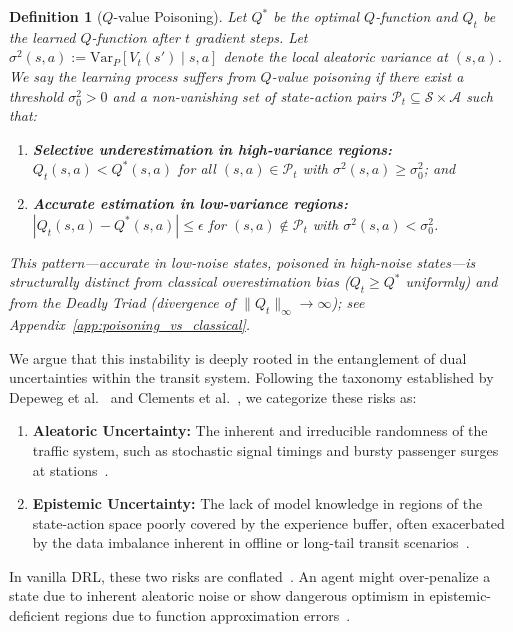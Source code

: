 \documentclass[10pt]{article}
\newtheorem{definition}[theorem]{Definition}
\begin{document}
\begin{definition}[$Q$-value Poisoning]
    \label{def:poisoning}
    Let $Q^*$ be the optimal $Q$-function and $Q_t$ be the learned $Q$-function after $t$ gradient steps.
    Let $\sigma^2(s,a) := \mathrm{Var}_{P}[V_t(s') \mid s,a]$ denote the local aleatoric variance at $(s,a)$.
    We say the learning process suffers from \emph{$Q$-value poisoning} if there exist
    a threshold $\sigma^2_0 > 0$ and a non-vanishing set of state-action pairs
    $\mathcal{P}_t \subseteq \mathcal{S}\times\mathcal{A}$ such that:
    \begin{enumerate}[label=(\roman*)]
        \item \textbf{Selective underestimation in high-variance regions:}
        $Q_t(s,a) < Q^*(s,a)$ for all $(s,a)\in\mathcal{P}_t$ with
        $\sigma^2(s,a) \ge \sigma^2_0$; and
        \item \textbf{Accurate estimation in low-variance regions:}
        $|Q_t(s,a) - Q^*(s,a)| \le \epsilon$ for $(s,a)\notin\mathcal{P}_t$
        with $\sigma^2(s,a) < \sigma^2_0$.
    \end{enumerate}
    This pattern---accurate in low-noise states, poisoned in high-noise states---is
    \emph{structurally distinct} from classical overestimation bias
    ($Q_t \ge Q^*$ uniformly) and from the Deadly Triad
    (divergence of $\|Q_t\|_\infty \to \infty$); see Appendix~\ref{app:poisoning_vs_classical}.
\end{definition}

We argue that this instability is deeply rooted in the entanglement of dual uncertainties within the transit system. Following the taxonomy established by Depeweg et al.~\cite{Depeweg2018Decomposition} and Clements et al.~\cite{Clements2019EstimatingRisk}, we categorize these risks as:
\begin{enumerate}
    \item \textbf{Aleatoric Uncertainty:} The inherent and irreducible randomness of the traffic system, such as stochastic signal timings and bursty passenger surges at stations~\cite{Hullermeier2021AleatoricEpistemic}.
    \item \textbf{Epistemic Uncertainty:} The lack of model knowledge in regions of the state-action space poorly covered by the experience buffer, often exacerbated by the data imbalance inherent in offline or long-tail transit scenarios~\cite{An2021UncertaintyEnsemble}.
\end{enumerate}
In vanilla DRL, these two risks are conflated~\cite{Kendall2017WhatUncertainties}. An agent might over-penalize a state due to inherent aleatoric noise or show dangerous optimism in epistemic-deficient regions due to function approximation errors~\cite{Fujimoto2018TD3}.
\end{document}
